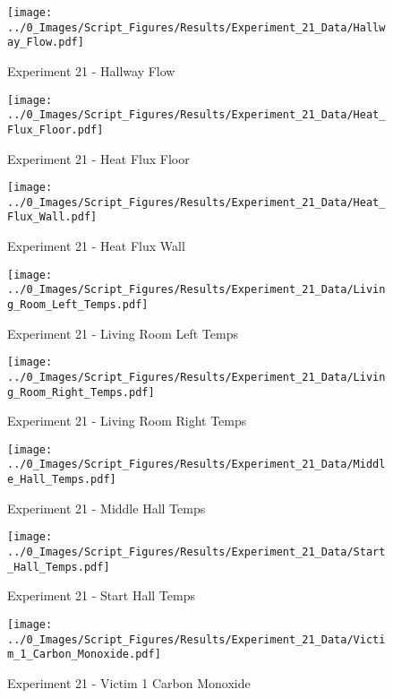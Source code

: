 	\begin{figure}[H]
		\centering
		\texttt{[image: ../0\_Images/Script\_Figures/Results/Experiment\_21\_Data/Hallway\_Flow.pdf]}
		\caption[]{Experiment 21 - Hallway Flow}
	\end{figure}
 
	\clearpage

	\begin{figure}[H]
		\centering
		\texttt{[image: ../0\_Images/Script\_Figures/Results/Experiment\_21\_Data/Heat\_Flux\_Floor.pdf]}
		\caption[]{Experiment 21 - Heat Flux Floor}
	\end{figure}
 

	\begin{figure}[H]
		\centering
		\texttt{[image: ../0\_Images/Script\_Figures/Results/Experiment\_21\_Data/Heat\_Flux\_Wall.pdf]}
		\caption[]{Experiment 21 - Heat Flux Wall}
	\end{figure}
 
	\clearpage

	\begin{figure}[H]
		\centering
		\texttt{[image: ../0\_Images/Script\_Figures/Results/Experiment\_21\_Data/Living\_Room\_Left\_Temps.pdf]}
		\caption[]{Experiment 21 - Living Room Left Temps}
	\end{figure}
 

	\begin{figure}[H]
		\centering
		\texttt{[image: ../0\_Images/Script\_Figures/Results/Experiment\_21\_Data/Living\_Room\_Right\_Temps.pdf]}
		\caption[]{Experiment 21 - Living Room Right Temps}
	\end{figure}
 
	\clearpage

	\begin{figure}[H]
		\centering
		\texttt{[image: ../0\_Images/Script\_Figures/Results/Experiment\_21\_Data/Middle\_Hall\_Temps.pdf]}
		\caption[]{Experiment 21 - Middle Hall Temps}
	\end{figure}
 

	\begin{figure}[H]
		\centering
		\texttt{[image: ../0\_Images/Script\_Figures/Results/Experiment\_21\_Data/Start\_Hall\_Temps.pdf]}
		\caption[]{Experiment 21 - Start Hall Temps}
	\end{figure}
 
	\clearpage

	\begin{figure}[H]
		\centering
		\texttt{[image: ../0\_Images/Script\_Figures/Results/Experiment\_21\_Data/Victim\_1\_Carbon\_Monoxide.pdf]}
		\caption[]{Experiment 21 - Victim 1 Carbon Monoxide}
	\end{figure}
 

